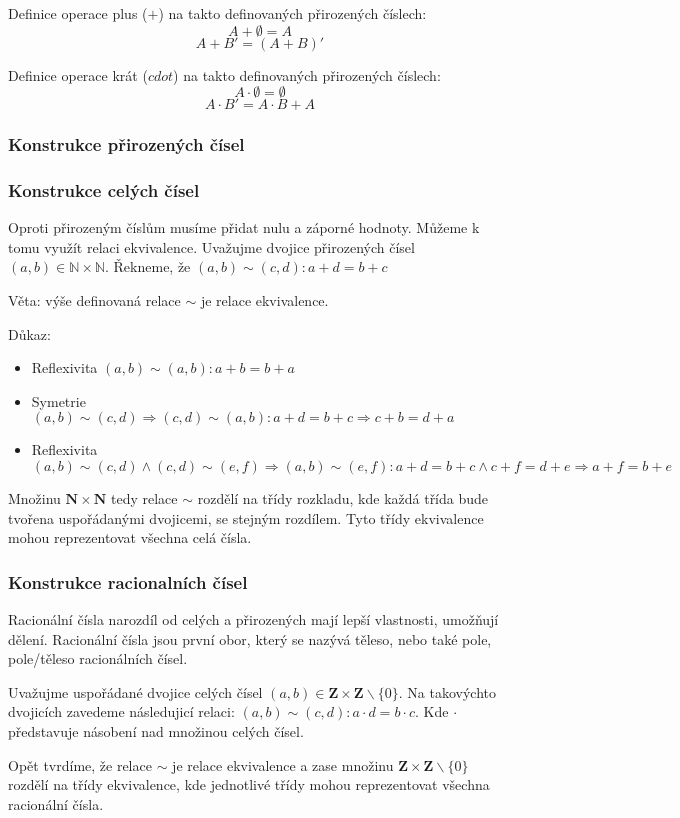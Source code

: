 Definice operace plus ($+$) na takto definovaných přirozených číslech:
$$A + \emptyset = A$$
$$A + B' = (A+B)'$$

Definice operace krát ($cdot$) na takto definovaných přirozených číslech:
$$A \cdot \emptyset = \emptyset$$
$$A \cdot B' = A \cdot B + A$$

\subsubsection*{Konstrukce přirozených čísel}
\subsubsection*{Konstrukce celých čísel}
Oproti přirozeným číslům musíme přidat nulu a záporné hodnoty. Můžeme k tomu
využít relaci ekvivalence. Uvažujme dvojice přirozených čísel
$(a, b) \in \mathbb{N} \times \mathbb{N}$. Řekneme, že $(a, b) \sim (c, d): a + d = b + c$

Věta: výše definovaná relace $\sim$ je relace ekvivalence.

Důkaz:
\begin{itemize}
	\item Reflexivita $(a, b) \sim (a, b): a + b = b + a$
	\item Symetrie $(a, b) \sim (c, d) \Rightarrow (c, d) \sim (a, b): a + d = b +
	c \Rightarrow c + b = d + a$
	\item Reflexivita $(a, b) \sim (c, d) \wedge (c, d) \sim (e, f) \Rightarrow (a, b) \sim (e, f):
	a + d = b + c \wedge c + f = d + e \Rightarrow a + f = b + e$
\end{itemize}
Množinu $\mathbf{N} \times \mathbf{N}$ tedy relace $\sim$ rozdělí na třídy rozkladu, kde každá třída
bude tvořena uspořádanými dvojicemi, se stejným rozdílem. Tyto třídy ekvivalence mohou reprezentovat
všechna celá čísla.

\subsubsection*{Konstrukce racionalních čísel}
Racionální čísla narozdíl od celých a přirozených mají lepší vlastnosti, umožňují dělení.
Racionální čísla jsou první obor, který se nazývá těleso, nebo také pole, pole/těleso racionálních
čísel.

Uvažujme uspořádané dvojice celých čísel
$(a, b) \in \mathbf{Z} \times \mathbf{Z} \smallsetminus \{0\}$.
Na takovýchto dvojicích zavedeme následujicí relaci: $(a, b) \sim (c, d): a \cdot d=b \cdot c$.
Kde $\cdot$ představuje násobení nad množinou celých čísel.

Opět tvrdíme, že relace $\sim$ je relace ekvivalence a zase množinu
$\mathbf{Z} \times \mathbf{Z} \smallsetminus \{0\}$ rozdělí na třídy ekvivalence, kde jednotlivé
třídy mohou reprezentovat všechna racionální čísla.